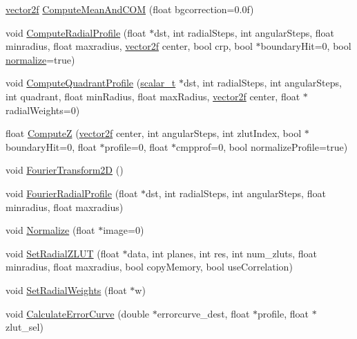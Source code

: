 \begin{DoxyCompactItemize}
\item 
\hyperlink{std__incl_8h_aba974726076ec2d63a67114c536d123e}{vector2f} \hyperlink{class_c_p_u_tracker_a18c3c6ec23abbbfb018d30b166ed140e}{Compute\+Mean\+And\+C\+OM} (float bgcorrection=0.\+0f)
\item 
void \hyperlink{class_c_p_u_tracker_a425db1a2a66d9635d2b4b565ecfdc3b0}{Compute\+Radial\+Profile} (float $\ast$dst, int radial\+Steps, int angular\+Steps, float minradius, float maxradius, \hyperlink{std__incl_8h_aba974726076ec2d63a67114c536d123e}{vector2f} center, bool crp, bool $\ast$boundary\+Hit=0, bool \hyperlink{utils_8h_a32b5810b69072511c66006593bcf7a89}{normalize}=true)
\item 
void \hyperlink{class_c_p_u_tracker_a96cc7e3d9d65226c8aa718b4bb03a633}{Compute\+Quadrant\+Profile} (\hyperlink{scalar__types_8h_a03fcef84665498b9cfcf9c7cc25574e9}{scalar\+\_\+t} $\ast$dst, int radial\+Steps, int angular\+Steps, int quadrant, float min\+Radius, float max\+Radius, \hyperlink{std__incl_8h_aba974726076ec2d63a67114c536d123e}{vector2f} center, float $\ast$radial\+Weights=0)
\item 
float \hyperlink{class_c_p_u_tracker_a8aaf20eab116d030a8549dadc5e2fb03}{ComputeZ} (\hyperlink{std__incl_8h_aba974726076ec2d63a67114c536d123e}{vector2f} center, int angular\+Steps, int zlut\+Index, bool $\ast$boundary\+Hit=0, float $\ast$profile=0, float $\ast$cmpprof=0, bool normalize\+Profile=true)
\item 
void \hyperlink{class_c_p_u_tracker_a723e3ea86ab2cc99e147477037895398}{Fourier\+Transform2D} ()
\item 
void \hyperlink{class_c_p_u_tracker_a680410d9616a6e65ea1ad430aa8a56cf}{Fourier\+Radial\+Profile} (float $\ast$dst, int radial\+Steps, int angular\+Steps, float minradius, float maxradius)
\item 
void \hyperlink{class_c_p_u_tracker_a86461dca5334095dc16624d13e9e859d}{Normalize} (float $\ast$image=0)
\item 
void \hyperlink{class_c_p_u_tracker_a4ce07a1fc9189a4bdd66f5e6917af28b}{Set\+Radial\+Z\+L\+UT} (float $\ast$data, int planes, int res, int num\+\_\+zluts, float minradius, float maxradius, bool copy\+Memory, bool use\+Correlation)
\item 
void \hyperlink{class_c_p_u_tracker_a1b14ce6b297fa7f0816a28973a881a95}{Set\+Radial\+Weights} (float $\ast$w)
\item 
void \hyperlink{class_c_p_u_tracker_a3505604c838186c348562bac8a2fedfe}{Calculate\+Error\+Curve} (double $\ast$errorcurve\+\_\+dest, float $\ast$profile, float $\ast$zlut\+\_\+sel)

\end{DoxyCompactItemize}
